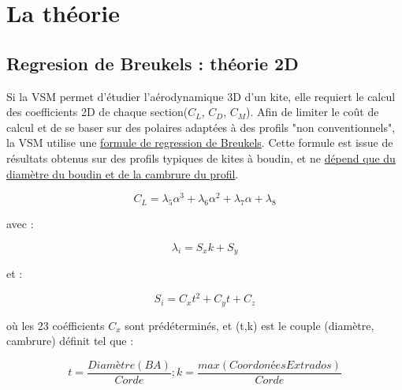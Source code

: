 \IEEEpeerreviewmaketitle
\section{La théorie}
\label{sec:Ch2}

\subsection{\textbf{Regresion de Breukels : théorie 2D}} 
\label{sec:Ch2.1}

Si la VSM permet d'étudier l'aérodynamique 3D d'un kite, elle requiert le calcul des coefficients 2D de chaque section($C_L$, $C_D$, $C_M$). Afin de limiter le coût de calcul et de se baser sur des polaires adaptées à des profils "non conventionnels", la VSM utilise une \underline{formule de regression de Breukels}. 
Cette formule est issue de résultats obtenus sur des profils typiques de kites à boudin, et ne \underline{dépend que du diamètre du boudin et de la cambrure du profil}. \\

\begin{center}
    \begin{equation}
        C_L = \lambda_5  \alpha^3 +\lambda_6  \alpha^2 + \lambda_7  \alpha + \lambda_8
        \label{eq:Cl_breukels}
    \end{equation}
\end{center}
avec :
\begin{center}
    \begin{equation}
        \lambda_i = S_x  k + S_y
        \label{eq:lamba_breukels}
    \end{equation}
\end{center}
et :
\begin{center}
    \begin{equation}
        S_i = C_x  t^2 + C_y  t + C_z
        \label{eq:S_breukels}
    \end{equation}
\end{center}
où les 23 coéfficients $C_x$ sont prédéterminés, et (t,k) est le couple (diamètre, cambrure) définit tel que :
\begin{center}
    \begin{equation}
        t = \frac{Diamètre(BA)}{Corde} ; k = \frac{max(CoordonéesExtrados)}{Corde}
        \label{eq:tk_breukels}
    \end{equation}
\end{center}

